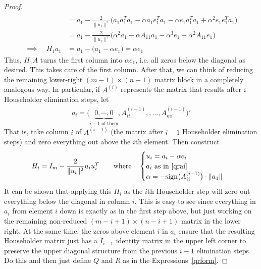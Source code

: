 \documentclass[12pt]{book}
\numberwithin{equation}{section} %
\theoremstyle{plain}
\theoremstyle{definition}
\theoremstyle{remark}
\begin{document}
\begin{proof}
\begin{align*}
  \\
  &= a_1
    - \frac{2}{\lVert u_1\rVert^2}
    \big(
      a_1a_1^Ta_1 - \alpha a_1e_1^Ta_1 - \alpha e_1a_1^Ta_1
      + \alpha^2e_1e_1^Ta_1
    \big)
  \\
  &= a_1
    - \frac{2}{\lVert u_1\rVert^2}
    \big(
      \alpha^2a_1
      - \alpha A_{11}a_1
      -\alpha^3 e_1
      + \alpha^2A_{11}e_1
    \big)
  \\
  \implies\quad H_1a_1
  &= a_1
    -
    \big(
      a_1
      - \alpha e_1
    \big)
  =\alpha e_1
\end{align*}
Thus, $H_1A$ turns the first column into $\alpha e_1$, i.e. all zeros
below the diagonal as desired.
This takes care of the first column. After that, we can think of
reducing the remaining lower-right $(m-1)\times (n-1)$ matrix block in a
completely analogous way. In particular, if $A^{(i)}$ represents the
matrix that results after $i$ Householder elimination steps, let
\begin{align}
  a_i =
  \big(
  \underbrace{0,\cdots, 0}_{\text{$i-1$ of them}},
  A_{ii}^{(i-1)}, ,\ldots,A_{mi}^{(i-1)}
  \big)'
  \label{qrai}
\end{align}
That is, take column $i$ of $A^{(i-1)}$ (the matrix after $i-1$
Householder elimination steps) and zero everything out above the $i$th
element. Then construct
\begin{align*}
  H_i = I_m - \frac{2}{\lVert u_i\lVert^2}u_iu_i^T
  \qquad \text{where}\quad
  \begin{cases}
    u_i = a_i -\alpha e_i \\
    \text{$a_i$ as in \ref{qrai}} \\
    \alpha = -\text{sign}\big(A_{ii}^{(i-1)}\big)\cdot \lVert a_1\rVert
  \end{cases}
\end{align*}
It can be shown that applying this $H_i$ as the $i$th Householder step
will zero out everything below the diagonal in column $i$. This is easy
to see since everything in $a_i$ from element $i$ down is exactly as in
the first step above, but just working on the remaining non-reduced
$(m-i+1)\times (n-i+1)$ matrix in the lower right. At the same time, the
zeros above element $i$ in $a_i$ ensure that the resulting Householder
matrix just has a $I_{i-1}$ identity matrix in the upper left corner to
preserve the upper diagonal structure from the previous $i-1$
elimination steps. Do this and then just define $Q$ and $R$ as in the
Expressions~\ref{qrform}.
\end{proof}
\end{document}
